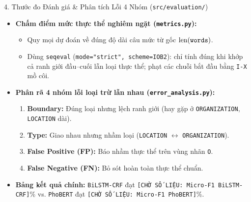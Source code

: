 \documentclass[aspectratio=169,10pt]{beamer}
\begin{document}
\begin{frame}{4. Thước đo Đánh giá \& Phân tích Lỗi 4 Nhóm (\texttt{src/evaluation/})}
  \begin{itemize}
    \item \textbf{Chấm điểm mức thực thể nghiêm ngặt (\texttt{metrics.py}):}
      \begin{itemize}
        \item Quy mọi dự đoán về đúng độ dài câu mức từ gốc $\text{len}(\text{\texttt{words}})$.
        \item Dùng \texttt{seqeval} (\texttt{mode="strict", scheme=IOB2}): chỉ tính đúng khi khớp cả ranh giới đầu--cuối lẫn loại thực thể; phạt các chuỗi bắt đầu bằng \texttt{I-X} mồ côi.
      \end{itemize}
    \item \textbf{Phân rã 4 nhóm lỗi loại trừ lẫn nhau (\texttt{error\_analysis.py}):}
      \begin{enumerate}
        \item \textbf{Boundary:} Đúng loại nhưng lệch ranh giới (hay gặp ở \texttt{ORGANIZATION}, \texttt{LOCATION} dài).
        \item \textbf{Type:} Giao nhau nhưng nhầm loại (\texttt{LOCATION} $\leftrightarrow$ \texttt{ORGANIZATION}).
        \item \textbf{False Positive (FP):} Báo nhầm thực thể trên vùng nhãn \texttt{O}.
        \item \textbf{False Negative (FN):} Bỏ sót hoàn toàn thực thể chuẩn.
      \end{enumerate}
    \item \textbf{Bảng kết quả chính:} \texttt{BiLSTM-CRF} đạt \texttt{[CHỜ SỐ LIỆU: Micro-F1 BiLSTM-CRF]}\% vs. \texttt{PhoBERT} đạt \texttt{[CHỜ SỐ LIỆU: Micro-F1 PhoBERT]}\%.
  \end{itemize}
\end{frame}
\end{document}
